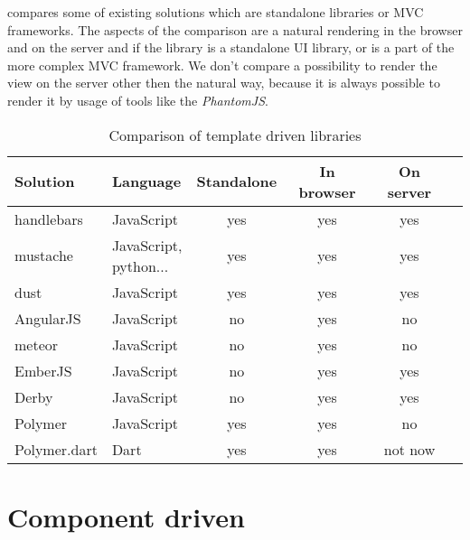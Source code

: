 	 compares some of existing solutions which are standalone libraries or MVC frameworks.
	The aspects of the comparison are a natural rendering in the browser and  on the server and if the library is a standalone UI library, 
	or is a part of the more complex MVC framework. 
	We don't compare a possibility to render the view on the server other then the natural way, 
	because it is always possible to render it by usage of tools like the \textit{PhantomJS}.

	\begin{table}
		\begin{tabular}{|l|l|c|c|c|c|}
			\hline
			\textbf{Solution}& \textbf{Language}   & \textbf{Standalone} & \textbf{In browser} & \textbf{On server} \\
			\hline
			handlebars       & JavaScript          &         yes         &        yes          &        yes         \\
			\hline
			{{mustache}}     & \shortstack{JavaScript,  
														\\		python...} &        yes         &        yes          &        yes          \\
			\hline
			dust             & JavaScript          &         yes         &        yes          &        yes         \\
			\hline
			AngularJS        & JavaScript          &         no          &        yes          &        no          \\
			\hline
			meteor           & JavaScript          &         no          &        yes          &        no          \\
			\hline
			EmberJS          & JavaScript          &         no          &        yes          &        yes         \\
			\hline
			Derby            & JavaScript          &         no          &        yes          &        yes         \\
			\hline
			Polymer          & JavaScript          &         yes         &        yes          &        no          \\
			\hline
			Polymer.dart     & Dart                &         yes         &        yes          &      not now       \\
			\hline
		\end{tabular}
		\caption{Comparison of template driven libraries}
		\label{table:template-driven-libraries}
	\end{table}

\section{Component driven}\label{sec:existing-component}

